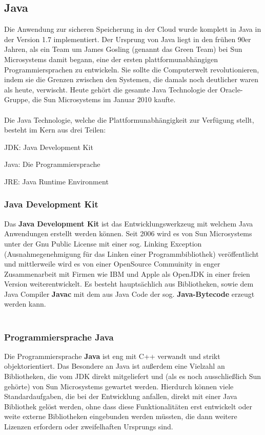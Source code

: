 \documentclass[13pt,a4paper,bibliography=totocnumbered,listof=totocnumbered]{scrartcl}
\begin{document}
\subsection{Java}\label{JavaV}
Die Anwendung zur sicheren Speicherung in der Cloud wurde komplett in Java in der Version 1.7 implementiert. Der Ursprung von Java liegt in den frühen 90er Jahren, als ein Team um James Gosling (genannt das Green Team) bei Sun Microsystems damit begann, eine der ersten plattformunabhängigen Programmiersprachen zu entwickeln. Sie sollte die Computerwelt revolutionieren, indem sie die Grenzen zwischen den Systemen, die damals noch deutlicher waren als heute, verwischt. Heute gehört die gesamte Java Technologie der Oracle-Gruppe, die Sun Microsystems im Januar 2010 kaufte.\\
\cite{1}\cite{2}\cite[S. 52]{3}\\

Die Java Technologie, welche die Plattformunabhängigkeit zur Verfügung stellt, besteht im Kern aus drei Teilen:
\begin{compactitem}
	\item JDK: Java Development Kit
	\item Java: Die Programmiersprache
	\item JRE: Java Runtime Environment
\end{compactitem}

\subsubsection{Java Development Kit}
Das \textbf{Java Development Kit} ist das Entwicklungswerkzeug mit welchem Java Anwendungen erstellt werden können. Seit 2006 wird es von Sun Microsystems unter der Gnu Public License mit einer sog. Linking Exception (Ausnahmegenehmigung für das Linken einer Programmbibliothek) veröffentlicht und mittlerweile wird es von einer OpenSource Commuinity in enger Zusammenarbeit mit Firmen wie IBM und Apple als OpenJDK in einer freien Version weiterentwickelt. Es besteht hauptsächlich aus Bibliotheken, sowie dem Java Compiler \textbf{Javac} mit dem aus Java Code der sog. \textbf{Java-Bytecode} erzeugt werden kann.\\
\cite[S. 63f]{3}\\

\subsubsection{Programmiersprache Java}
Die Programmiersprache \textbf{Java} ist eng mit C++ verwandt und strikt objektorientiert. Das Besondere an Java ist außerdem eine Vielzahl an Bibliotheken, die vom JDK direkt mitgeliefert und (als es noch ausschließlich Sun gehörte) von Sun Microsystems gewartet werden. Hierdurch können viele Standardaufgaben, die bei der Entwicklung anfallen, direkt mit einer Java Bibliothek gelöst werden, ohne dass diese Funktionalitäten erst entwickelt oder weite externe Bibliotheken eingebunden werden müssten, die dann weitere Lizenzen erfordern oder zweifelhaften Ursprungs sind.\\
\cite[S. 55, 60]{3}
\end{document}
